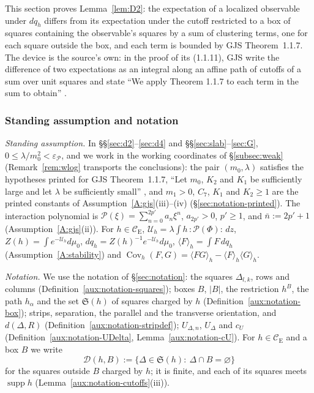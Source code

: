 \documentclass[11pt,a4paper]{article}
\theoremstyle{plain}
\theoremstyle{definition}
\theoremstyle{plain}
\theoremstyle{definition}
\newcommand{\CE}{\mathcal{C}_{\mathrm E}}
\DeclareMathOperator{\supp}{supp}
\DeclareMathOperator{\Cov}{Cov}
\newcommand{\ev}[2]{\langle #1\rangle_{#2}}            %
\newcommand{\Uc}{\mathcal U}
\newcommand{\dmu}{d\mu_0}
\begin{document}
This section proves Lemma~\ref{lem:D2}: the expectation of a localized observable under $dq_h$
differs from its expectation under the cutoff restricted to a box of squares containing the
observable's squares by a sum of clustering terms, one for each square outside the box, and
each term is bounded by GJS Theorem~1.1.7.  The device is the source's own: in the proof of its
(1.1.11), GJS write the difference of two expectations as an integral along an affine path of
cutoffs of a sum over unit squares and state ``We apply Theorem 1.1.7 to each term in the sum to
obtain'' \cite[p.~595]{GJS}.

\subsubsection{Standing assumption and notation}\label{sub:d2-conv}

\emph{Standing assumption.}  In \S\S\ref{sec:d2}--\ref{sec:d4} and \S\S\ref{sec:slab}--\ref{sec:G},
$0\le\lambda/m_0^2<\varepsilon_{\mathscr P}$, and we work in the working coordinates of \S\ref{subsec:weak} (Remark~\ref{rem:wlog} transports the conclusions):
the pair $(m_0,\lambda)$ satisfies the hypotheses printed for GJS Theorem~1.1.7, ``Let $m_0$,
$K_2$ and $K_1$ be sufficiently large and let $\lambda$ be sufficiently small''
\cite[p.~594]{GJS}, and $m_1>0$, $C_7$, $K_1$ and $K_2\ge1$ are the printed constants of
Assumption~\ref{A:gjs}(iii)--(iv) (\S\ref{sec:notation-printed}).  The
interaction polynomial is $\mathscr P(\xi)=\sum_{n=0}^{2p'}a_n\xi^n$, $a_{2p'}>0$, $p'\ge1$, and
$\bar n:=2p'+1$ (Assumption~\ref{A:gjs}(ii)).  For $h\in\CE$,
$\Uc_h=\lambda\int h\,{:}\mathscr P(\Phi){:}\,dz$, $Z(h)=\int e^{-\Uc_h}\dmu$,
$dq_h=Z(h)^{-1}e^{-\Uc_h}\dmu$, $\ev{F}{h}=\int F\,dq_h$ (Assumption~\ref{A:stability}) and $\Cov_h(F,G)=\ev{FG}{h}-\ev{F}{h}\ev{G}{h}$.

\emph{Notation.}  We use the notation of \S\ref{sec:notation}: the squares $\Delta_{l,k}$, rows
and columns (Definition~\ref{aux:notation-squares}); boxes $B$, $|B|$, the restriction $h^B$,
the path $h_\alpha$ and the set $\mathfrak S(h)$ of squares charged by $h$
(Definition~\ref{aux:notation-box}); strips, separation, the parallel and the transverse
orientation, and $d(\Delta,R)$ (Definition~\ref{aux:notation-stripdef}); $U_{\Delta,n}$,
$U_\Delta$ and $c_U$ (Definition~\ref{aux:notation-UDelta}, Lemma~\ref{aux:notation-cU}).  For
$h\in\CE$ and a box $B$ we write
\[
 \mathcal D(h,B):=\{\Delta\in\mathfrak S(h):\ \Delta\cap B=\varnothing\}
\]
for the squares outside $B$ charged by $h$; it is finite, and each of its squares meets
$\supp h$ (Lemma~\ref{aux:notation-cutoffs}(iii)).
\end{document}
